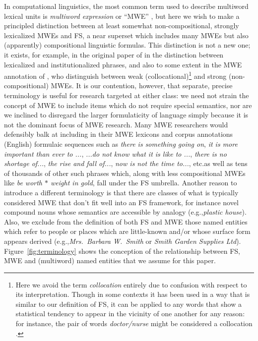 \documentclass[11pt,letterpaper]{article}
\makeatletter
\def \eg {e.g.,\@ }
\def \etc {etc.\@ }
\newcommand{\dotts}{...}
\newcommand{\gap}{$*$\xspace}
\newcommand{\ex}[1]{\textit{#1}\xspace}
\newcommand{\figref}[2][]{Figure#1~\ref{#2}\xspace}
\makeatother
\begin{document}
In computational linguistics, the most common term used to describe multiword lexical units is \emph{multiword expression} or ``MWE'' \cite{Sag02,Baldwin10}, but here we wish to make a principled distinction between at least somewhat non-compositional, strongly lexicalized MWEs and FS, a near superset which includes many MWEs but also (apparently) compositional linguistic formulas. This distinction is not a new one; it exists, for example, in the original paper of  in the distinction between lexicalized and institutionalized phrases, and also to some extent in the MWE annotation of , who distinguish between weak (collocational)\footnote{Here we avoid the term \emph{collocation} entirely due to confusion with respect to its interpretation. Though in some contexts it has been used in a way that is similar to our definition of FS, it can be applied to any words that show a statistical tendency to appear in the vicinity of one another for any reason: for instance, the pair of words \ex{doctor/nurse} might be considered a collocation \cite{Ramisch14}.}  and strong (non-compositional) MWEs. It is our contention, however, that separate, precise terminology is useful for research targeted at either class: we need not strain the concept of MWE to include items which do not require special semantics, nor are we inclined to disregard the larger formulaticity of language simply because it is not the dominant focus of MWE research. Many MWE researchers would defensibly balk at including in their MWE lexicons and corpus annotations (English) formulaic sequences such as \ex{there is something going on}, \ex{it is more important than ever to \dotts}, \ex{\dotts do not know what it is like to \dotts}, \ex{there is no shortage of\dotts}, \ex{the rise and fall of\dotts}, \ex{now is not the time to\dotts}, \etc as well as tens of thousands of other such phrases which, along with less compositional MWEs like \ex{be worth \gap weight in gold}, fall under the FS umbrella. Another reason to introduce a different terminology is that there are classes of what is typically considered MWE that don't fit well into an FS framework, for instance novel compound nouns whose semantics are accessible by analogy (\eg \ex{plastic house}). Also, we exclude from the definition of both FS and MWE those named entities which refer to people or places which are little-known and/or whose surface form appears derived (\eg \ex{Mrs.\ Barbara W.\ Smith} or \ex{Smith Garden Supplies Ltd}). \figref{fig:terminology} shows the conception of the relationship between FS, MWE and (multiword) named entities that we assume for this paper.
\end{document}
